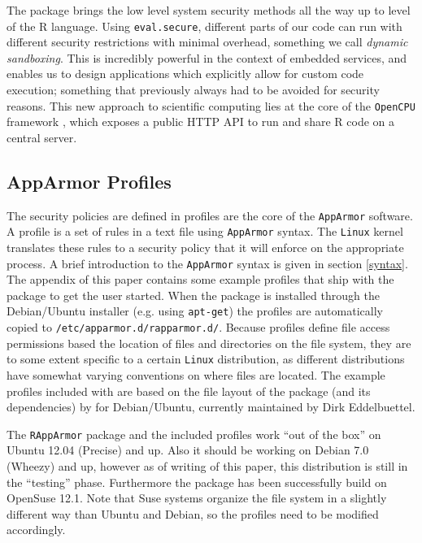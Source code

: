 \documentclass[article]{jss}
\newcommand{\R}{\textsf{R}\xspace}
\newcommand{\AppArmor}{\texttt{AppArmor}\xspace}
\newcommand{\RAppArmor}{\pkg{RAppArmor}\xspace}
\newcommand{\Linux}{\texttt{Linux}\xspace}
\begin{document}
The \RAppArmor package brings the low level system security methods all the way
up to level of the \R language. Using \texttt{eval.secure}, different parts of
our code can run with different security restrictions with minimal overhead,
something we call \emph{dynamic sandboxing}. This is incredibly powerful in the
context of embedded services, and enables us to design applications which
explicitly allow for custom code execution; something that previously always had
to be avoided for security reasons. This new approach to scientific computing lies
at the core of the \texttt{OpenCPU} framework \citep{opencpu}, which exposes a
public HTTP API to run and share \R code on a central server.

\subsection{AppArmor Profiles}

The security policies are defined in profiles are the core of the \AppArmor
software. A profile is a set of rules in a text file using \AppArmor syntax. The
\Linux kernel translates these rules to a security policy that it will enforce
on the appropriate process. A brief introduction to the \AppArmor syntax is
given in section \ref{syntax}. The appendix of this paper contains some example
profiles that ship with the \RAppArmor package to get the user started.
When the package is installed through the Debian/Ubuntu installer (e.g. using
\texttt{apt-get}) the profiles are automatically copied to
\texttt{/etc/apparmor.d/rapparmor.d/}. Because profiles define file access
permissions based the location of files and directories on the file system,
they are to some extent specific to a certain \Linux distribution, as different
distributions have somewhat varying conventions on where files are located. The
example profiles included with \RAppArmor are based on the file layout of
the  package (and its dependencies) by \cite{batesusing} for
Debian/Ubuntu, currently maintained by Dirk Eddelbuettel.

The \texttt{RAppArmor} package and the included profiles work ``out of the
box'' on Ubuntu 12.04 (Precise) and up. Also it should be working on Debian
7.0 (Wheezy) and up, however as of writing of this paper, this distribution is
still in the ``testing'' phase. Furthermore the package has been successfully
build on OpenSuse 12.1. Note that Suse systems organize the file system in a
slightly different way than Ubuntu and Debian, so the profiles need to be
modified accordingly.
\end{document}

